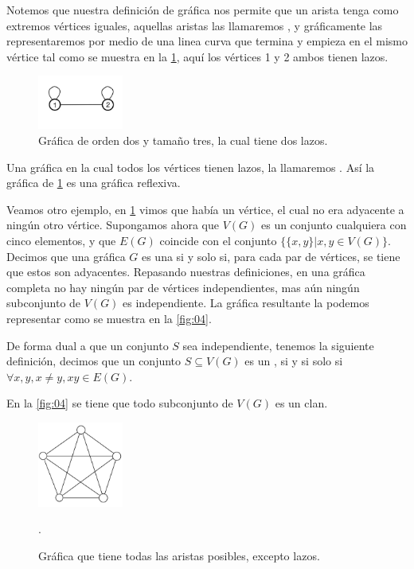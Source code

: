 Notemos que nuestra definición de gráfica nos permite que un arista tenga como extremos vértices iguales, aquellas aristas las llamaremos , y gráficamente las representaremos por medio de una linea curva que
termina y empieza en el mismo vértice tal como se muestra en la \cref{fig:02}, aquí los vértices 1 y 2 ambos tienen lazos.

\begin{figure}[H]
  \centering
  \includegraphics[width=0.25\textwidth]{recursos/capturas/02.jpg}
  \caption{Gráfica de orden dos y tamaño tres, la cual tiene dos lazos.}
  \label{fig:02}
\end{figure}

Una gráfica en la cual todos los vértices tienen lazos, la llamaremos . Así la gráfica de \cref{fig:02} es una gráfica reflexiva.

Veamos otro ejemplo, en \cref{fig:02} vimos que había un vértice, el cual no era adyacente a ningún otro vértice. Supongamos ahora que $V(G)$ es un conjunto cualquiera con cinco elementos, y que $E(G)$ coincide con el conjunto $\{ \{x,y\} | x,y\in V(G) \}$.
Decimos que una gráfica $G$ es una  si y solo si, para cada par de vértices, se tiene que estos son adyacentes. Repasando nuestras definiciones, en una gráfica completa no hay ningún par de vértices independientes, mas aún ningún subconjunto de $V(G)$ es independiente.
La gráfica resultante la podemos representar como se muestra en la \cref{fig:04}.

De forma dual a que un conjunto $S$ sea independiente, tenemos la siguiente definición, decimos que un conjunto $S\subseteq V(G)$ es un , si y si solo si $\forall x,y, x\neq y, xy\in E(G)$.   

En la \cref{fig:04} se tiene que todo subconjunto de $V(G)$ es un clan.

\begin{figure}[H]
  \centering
  \includegraphics[width=0.25\textwidth]{recursos/capturas/04.jpg}
  \caption{Gráfica que tiene todas las aristas posibles, excepto lazos.}.
  \label{fig:03}
\end{figure}

